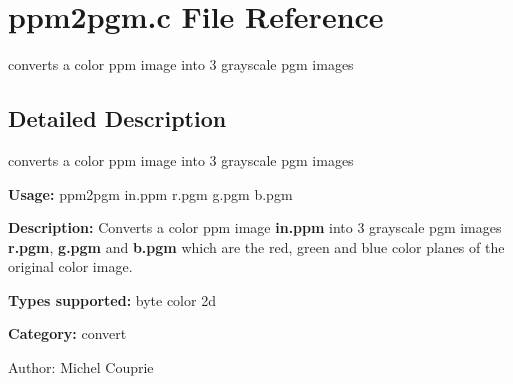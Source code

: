 \section{ppm2pgm.c File Reference}
\label{ppm2pgm_8c}
converts a color ppm image into 3 grayscale pgm images  




\label{_details}
\subsection{Detailed Description}
converts a color ppm image into 3 grayscale pgm images 

{\bf Usage:} ppm2pgm in.ppm r.pgm g.pgm b.pgm

{\bf Description:} Converts a color ppm image {\bf in.ppm} into 3 grayscale pgm images {\bf r.pgm}, {\bf g.pgm} and {\bf b.pgm} which are the red, green and blue color planes of the original color image.

{\bf Types supported:} byte color 2d

{\bf Category:} convert

\begin{Desc}
\item[Author:]Michel Couprie \end{Desc}
